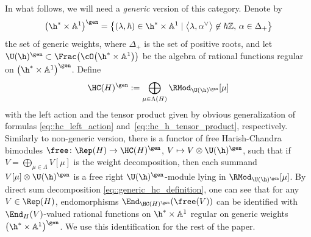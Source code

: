 	In what follows, we will need a \emph{generic} version of this category. Denote by
	\begin{equation}
		\label{eq::generic_weights}
		\bigl(\h^* \times \mathbb{A}^1\bigr)^{\gen} = \bigl\{(\lambda,\hbar) \in \h^* \times \mathbb{A}^1 \mid \bigl\langle \lambda, \alpha^{\vee} \bigr\rangle \not\in \hbar \mathbb{Z},\, \alpha \in \Delta_+\bigr\}
	\end{equation}
	the set of generic weights, where $\Delta_+$ is the set of positive roots, and let $\U(\h)^{\gen} \subset \Frac\bigl(\cO\bigl(\h^* \times \mathbb{A}^1\bigr)\bigr)$ be the algebra of rational functions regular on $\bigl(\h^* \times \mathbb{A}^1\bigr)^{\gen}$. Define
	\begin{equation}
		\label{eq::generic_hc_definition}
		\HC(H)^{\gen} := \bigoplus\limits_{\mu\in \Lambda(H)} \RMod_{\U(\h)^{\gen}} [\mu]
	\end{equation}
	with the left action and the tensor product given by obvious generalization of formulas \eqref{eq::hc_left_action} and~\eqref{eq::hc_h_tensor_product}, respectively. Similarly to non-generic version, there is a functor of free Harish-Chandra bimodules
$
	\free\colon \Rep(H) \rightarrow \HC(H)^{\gen}$, $ V \mapsto V \otimes \U(\h)^{\gen}$,
	such that if $V = \bigoplus_{\mu\in \Lambda} V[\mu]$ is the weight decomposition, then each summand $V[\mu] \otimes \U(\h)^{\gen}$ is a free right $\U(\h)^{\gen}$-module lying in $\RMod_{\U(\h)^{\gen}}[\mu]$. By direct sum decomposition \eqref{eq::generic_hc_definition}, one can see that for any $V\in \Rep(H)$, endomorphisms $\End_{\HC(H)^{\gen}} (\free(V))$ can be identified with $\End_H(V)$-valued rational functions on $\h^* \times \mathbb{A}^1$ regular on generic weights $\bigl(\h^* \times \mathbb{A}^1\bigr)^{\gen}$. We use this identification for the rest of the paper.
	
